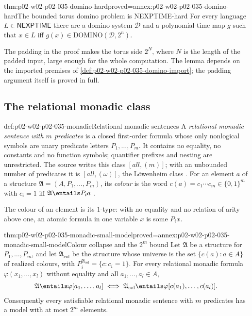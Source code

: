 \begin{hblemma}{thm:p02-w02-p02-035-domino-hard}{proved=annex:p02-w02-p02-035-domino-hard}{The bounded torus domino problem is NEXPTIME-hard}
For every language \(L\in\mathsf{NEXPTIME}\) there are a domino system
\(\mathcal D\) and a polynomial-time map \(g\) such that
\(x\in L\) iff \(g(x)\in\mathrm{DOMINO}(\mathcal D,2^n)\).
\end{hblemma}

The padding in the proof makes the torus side \(2^{N}\), where \(N\) is the
length of the padded input, large enough for the whole computation.  The
lemma depends on the imported premises of
\cref{def:p02-w02-p02-035-domino-import}; the padding argument itself is
proved in full.

\subsection{The relational monadic class}
\label{sec:p02-w02-p02-035-monadic}

\begin{hbdefinition}{def:p02-w02-p02-035-monadic}{Relational monadic sentences}
A \emph{relational monadic sentence with \(m\) predicates} is a closed
first-order formula whose only nonlogical symbols are unary predicate letters
\(P_1,\ldots,P_m\).  It contains no equality, no constants and no function
symbols; quantifier prefixes and nesting are unrestricted.  The source writes
this class \([\mathit{all},(m)]\); with an unbounded number of predicates it is
\([\mathit{all},(\omega)]\), the L\"owenheim class
\cite[p.~249]{BorgerGradelGurevich1997}.  For an element \(a\) of a structure
\(\mathfrak A=(A,P_1,\ldots,P_m)\), its \emph{colour} is the word
\(c(a)=c_1\cdots c_m\in\{0,1\}^m\) with \(c_i=1\) iff
\(\mathfrak A\entails P_ia\) \cite[proof of prop.~6.2.1]{BorgerGradelGurevich1997}.
\end{hbdefinition}

The colour of an element is its \(1\)-type: with no equality and no relation
of arity above one, an atomic formula in one variable \(x\) is some
\(P_ix\).

\begin{hbtheorem}{thm:p02-w02-p02-035-monadic-small-model}{proved=annex:p02-w02-p02-035-monadic-small-model}{Colour collapse and the \(2^m\) bound}
Let \(\mathfrak A\) be a structure for \(P_1,\ldots,P_m\), and let
\(\mathfrak A_{\mathrm{col}}\) be the structure whose universe is the set
\(\{c(a):a\in A\}\) of realized colours, with
\(P_i^{\mathfrak A_{\mathrm{col}}}=\{c:c_i=1\}\).  For every relational
monadic formula \(\varphi(x_1,\ldots,x_l)\) without equality and all
\(a_1,\ldots,a_l\in A\),
\[
 \mathfrak A\entails\varphi[a_1,\ldots,a_l]
 \iff
 \mathfrak A_{\mathrm{col}}\entails\varphi[c(a_1),\ldots,c(a_l)].
\]
Consequently every satisfiable relational monadic sentence with \(m\)
predicates has a model with at most \(2^m\) elements.
\end{hbtheorem}

